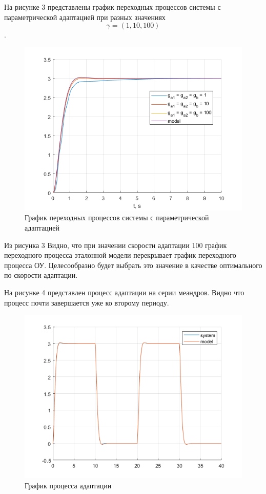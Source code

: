 \documentclass[a4paper,12pt]{extarticle} %
\begin{document}
На рисунке 3 представлены график переходных процессов системы с параметрической адаптацией при разных значениях \[\gamma = (1, 10, 100)\].
\begin{figure}[h]
    \centering
    \includegraphics[width=0.8\linewidth]{3.png}
    \caption{График переходных процессов системы с параметрической адаптацией}
    \label{fig:3}
\end{figure}
Из рисунка 3 Видно, что при значении скорости адаптации 100 график переходного процесса эталонной модели перекрывает график переходного процесса ОУ. Целесообразно будет выбрать это значение в качестве оптимального по скорости адаптации.

На рисунке 4 представлен процесс адаптации на серии меандров. Видно что процесс почти завершается уже ко второму периоду.
\begin{figure}[h!]
    \centering
    \includegraphics[width=0.8\linewidth]{4.png}
    \caption{График процесса адаптации}
    \label{fig:4}
\end{figure}
\end{document}
